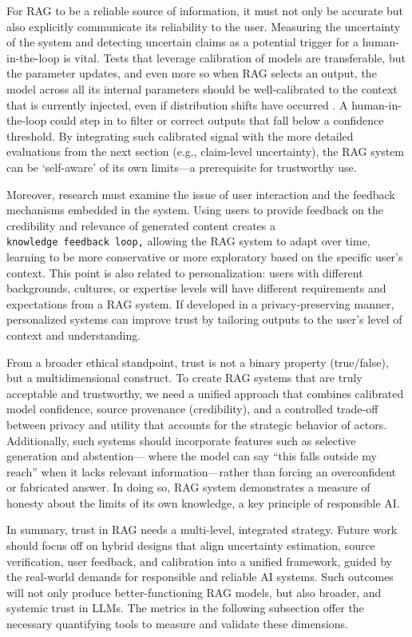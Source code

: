 \documentclass[11pt]{article}
\begin{document}
For RAG to be a reliable source of information, it must not only be accurate but also explicitly communicate its reliability to the user. Measuring the uncertainty of the system and detecting uncertain claims as a potential trigger for a human-in-the-loop is vital. Tests that leverage calibration of models are transferable, but the parameter updates, and even more so when RAG selects an output, the model across all its internal parameters should be well-calibrated to the context that is currently injected, even if distribution shifts have occurred \cite{ref167}. A human-in-the-loop could step in to filter or correct outputs that fall below a confidence threshold. By integrating such calibrated signal with the more detailed evaluations from the next section (e.g., claim-level uncertainty), the RAG system can be `self-aware' of its own limits---a prerequisite for trustworthy use.

Moreover, research must examine the issue of user interaction and the feedback mechanisms embedded in the system. Using users to provide feedback on the credibility and relevance of generated content creates a \texttt{knowledge\ feedback\ loop,} allowing the RAG system to adapt over time, learning to be more conservative or more exploratory based on the specific user's context. This point is also related to personalization: users with different backgrounds, cultures, or expertise levels will have different requirements and expectations from a RAG system. If developed in a privacy-preserving manner, personalized systems can improve trust by tailoring outputs to the user's level of context and understanding.

From a broader ethical standpoint, trust is not a binary property (true/false), but a multidimensional construct. To create RAG systems that are truly acceptable and trustworthy, we need a unified approach that combines calibrated model confidence, source provenance (credibility), and a controlled trade-off between privacy and utility that accounts for the strategic behavior of actors. Additionally, such systems should incorporate features such as selective generation and abstention--- where the model can say ``this falls outside my reach'' when it lacks relevant information---rather than forcing an overconfident or fabricated answer. In doing so, RAG system demonstrates a measure of honesty about the limits of its own knowledge, a key principle of responsible AI.

In summary, trust in RAG needs a multi-level, integrated strategy. Future work should focus off on hybrid designs that align uncertainty estimation, source verification, user feedback, and calibration into a unified framework, guided by the real-world demands for responsible and reliable AI systems. Such outcomes will not only produce better-functioning RAG models, but also broader, and systemic trust in LLMs. The metrics in the following subsection offer the necessary quantifying tools to measure and validate these dimensions.
\end{document}
